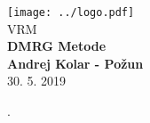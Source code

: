 \documentclass{article}
\begin{document}
\begin{titlepage}
    \begin{center}
        \vspace*{1cm}
        \Large
\texttt{[image: ../logo.pdf]}\\
        \Large
\vspace{1cm}
        VRM\\
        \huge
        \textbf{DMRG Metode\\}
\Large  
        \vspace{1cm}
        \textbf{Andrej Kolar - Po{\v z}un\\}
        \vspace{0.8cm}
 30. 5. 2019

\vfill
\normalsize
\end{center}. 
\end{titlepage}
\newpage
{}
\end{document}
